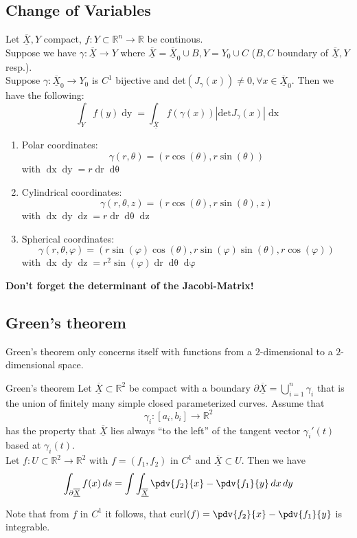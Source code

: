 \documentclass[a4paper,fontsize = 10pt]{article}
\def\R{\mathbb{R}}
\def\X{\underline{\overline{X}}}
\begin{document}
\subsection{Change of Variables}
Let $\X, Y$ compact, $f: Y \subset \R^n \to \R$ be continous. 
\\Suppose we have $\gamma: \X \to Y$ where $\X = \X_0 \cup B, Y = Y_0 \cup C$ ($B,C$ boundary of $\X,Y$ resp.).
\\Suppose $\gamma: \X_0 \to Y_0$ is $C^1$ bijective and det$(J_\gamma(x)) \neq 0, \forall x \in \X_0$.
Then we have the following:
\[\int_Yf(y)\mathop{dy} = \int_{\X}f(\gamma(x))|\text{det}J_{\gamma}(x)|\mathop{dx}\]

\begin{enumerate}
  \item Polar coordinates: \[\gamma(r, \theta) = (r \cos(\theta), r \sin(\theta))\] with \(\mathop{dx}\mathop{dy} = r \mathop{dr} \mathop{d\theta}\)
  \item Cylindrical coordinates: \[\gamma(r, \theta, z) = (r \cos(\theta), r \sin(\theta), z)\] with \(\mathop{dx} \mathop{dy} \mathop{dz} = r \mathop{dr} \mathop{d\theta} \mathop{dz}\)
  \item Spherical coordinates: \[\gamma(r, \theta, \varphi) = (r\sin(\varphi)\cos(\theta), r \sin(\varphi)\sin(\theta), r \cos(\varphi))\] with \(\mathop{dx}\mathop{dy}\mathop{dz} = r^2 \sin(\varphi) \mathop{dr} \mathop{d\theta} \mathop{d\varphi}\)
\end{enumerate}

\textbf{Don't forget the determinant of the Jacobi-Matrix!}

\subsection{Green's theorem}
Green's theorem only concerns itself with functions from a $2$-dimensional to a $2$-dimensional space. 

\begin{mainbox}{Green's theorem}
  Let $\X \subset \R^2$ be compact with a boundary $\partial \X = \bigcup_{i = 1}^{n}\gamma_i$ that is the union of finitely many simple closed parameterized curves. Assume that 
  \[\gamma_i: [a_i,b_i] \to \R^2\]
  has the property that $\X$ lies always ``to the left'' of the tangent vector $\gamma_i'(t)$ based at $\gamma_i(t)$. 
  \\Let $f: U \subset \R^2 \to \R^2$ with $f = (f_1, f_2)$ in $C^1$ and $\X \subset U$. Then we have
  \[\int_{\partial\X}f(x)\mathop{ds} = \int \int_{\X} \pdv{f_2}{x}-\pdv{f_1}{y} \mathop{dx}\mathop{dy}\]
\end{mainbox}
Note that from $f$ in $C^1$ it follows, that curl$(f) = \pdv{f_2}{x}-\pdv{f_1}{y}$ is integrable.
\end{document}

